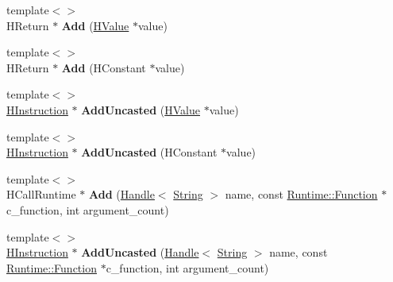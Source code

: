 \begin{DoxyCompactItemize}
\item 
\hypertarget{classv8_1_1internal_1_1_h_graph_builder_a0b63c2c20363e038a8dcb583aafc1e29}{}{\footnotesize template$<$$>$ }\\H\+Return $\ast$ {\bfseries Add} (\hyperlink{classv8_1_1internal_1_1_h_value}{H\+Value} $\ast$value)\label{classv8_1_1internal_1_1_h_graph_builder_a0b63c2c20363e038a8dcb583aafc1e29}

\item 
\hypertarget{classv8_1_1internal_1_1_h_graph_builder_adef4b9accd8c6c944c875d06d3ce8ed3}{}{\footnotesize template$<$$>$ }\\H\+Return $\ast$ {\bfseries Add} (H\+Constant $\ast$value)\label{classv8_1_1internal_1_1_h_graph_builder_adef4b9accd8c6c944c875d06d3ce8ed3}

\item 
\hypertarget{classv8_1_1internal_1_1_h_graph_builder_a2643fcfbc06f7c3f9427bdb6d57069ab}{}{\footnotesize template$<$$>$ }\\\hyperlink{classv8_1_1internal_1_1_h_instruction}{H\+Instruction} $\ast$ {\bfseries Add\+Uncasted} (\hyperlink{classv8_1_1internal_1_1_h_value}{H\+Value} $\ast$value)\label{classv8_1_1internal_1_1_h_graph_builder_a2643fcfbc06f7c3f9427bdb6d57069ab}

\item 
\hypertarget{classv8_1_1internal_1_1_h_graph_builder_a50b6c3ff1e04842c5e61a49518d63861}{}{\footnotesize template$<$$>$ }\\\hyperlink{classv8_1_1internal_1_1_h_instruction}{H\+Instruction} $\ast$ {\bfseries Add\+Uncasted} (H\+Constant $\ast$value)\label{classv8_1_1internal_1_1_h_graph_builder_a50b6c3ff1e04842c5e61a49518d63861}

\item 
\hypertarget{classv8_1_1internal_1_1_h_graph_builder_a4a1a32933ac61222348eb2c91c29142a}{}{\footnotesize template$<$$>$ }\\H\+Call\+Runtime $\ast$ {\bfseries Add} (\hyperlink{classv8_1_1internal_1_1_handle}{Handle}$<$ \hyperlink{classv8_1_1internal_1_1_string}{String} $>$ name, const \hyperlink{structv8_1_1internal_1_1_runtime_1_1_function}{Runtime\+::\+Function} $\ast$c\+\_\+function, int argument\+\_\+count)\label{classv8_1_1internal_1_1_h_graph_builder_a4a1a32933ac61222348eb2c91c29142a}

\item 
\hypertarget{classv8_1_1internal_1_1_h_graph_builder_a497b5cf5f6df26e1d7f351d7a5884a7c}{}{\footnotesize template$<$$>$ }\\\hyperlink{classv8_1_1internal_1_1_h_instruction}{H\+Instruction} $\ast$ {\bfseries Add\+Uncasted} (\hyperlink{classv8_1_1internal_1_1_handle}{Handle}$<$ \hyperlink{classv8_1_1internal_1_1_string}{String} $>$ name, const \hyperlink{structv8_1_1internal_1_1_runtime_1_1_function}{Runtime\+::\+Function} $\ast$c\+\_\+function, int argument\+\_\+count)\label{classv8_1_1internal_1_1_h_graph_builder_a497b5cf5f6df26e1d7f351d7a5884a7c}


\end{DoxyCompactItemize}
